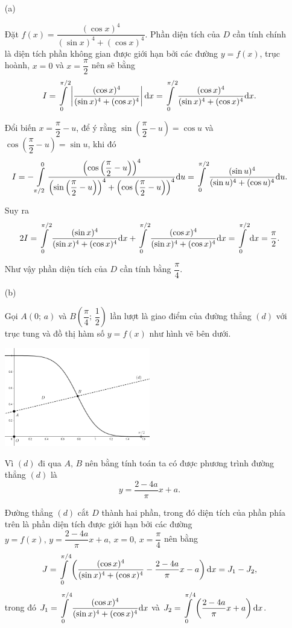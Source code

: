 \begin{enumerate}
    \item[(a)] {Đặt $f(x) = \dfrac{(\cos x)^4}{(\sin x)^4 + (\cos x)^4}$. Phần diện tích của $D$ cần tính chính là diện tích phần không gian được giới hạn bởi các đường $y = f(x)$, trục hoành, $x = 0$ và $x = \dfrac{\pi}{2}$ nên sẽ bằng 
    $$I = \int\displaylimits_{0}^{\pi/2}\left|\dfrac{(\cos x)^4}{(\sin x)^4 + (\cos x)^4}\right|\mathrm{d}x = \int\displaylimits_{0}^{\pi/2}\dfrac{(\cos x)^4}{(\sin x)^4 + (\cos x)^4}\mathrm{d}x.$$
    
    Đổi biến $x = \dfrac{\pi}{2} - u$, để ý rằng $\sin\left(\dfrac{\pi}{2}-u\right) = \cos u$ và $\cos\left(\dfrac{\pi}{2}-u\right) = \sin u$, khi đó $$I = -\int\displaylimits_{\pi/2}^{0}\dfrac{\left(\cos \left(\dfrac{\pi}{2}-u\right)\right)^4}{\left(\sin \left(\dfrac{\pi}{2}-u\right)\right)^4 + \left(\cos \left(\dfrac{\pi}{2}-u\right)\right)^4}\mathrm{d}u = \int\displaylimits_{0}^{\pi/2}\dfrac{(\sin u)^4}{(\sin u)^4 + (\cos u)^4}\mathrm{d}u.$$
    
    Suy ra $$2I = \int\displaylimits_{0}^{\pi/2}\dfrac{(\sin x)^4}{(\sin x)^4 + (\cos x)^4}\mathrm{d}x + \int\displaylimits_{0}^{\pi/2}\dfrac{(\cos x)^4}{(\sin x)^4 + (\cos x)^4}\mathrm{d}x = \int\displaylimits_{0}^{\pi/2}\mathrm{d}x = \dfrac{\pi}{2}.$$
    
    Như vậy phần diện tích của $D$ cần tính bằng $\dfrac{\pi}{4}$.}
    \item[(b)] {Gọi $A(0;\,a)$ và $B\left(\dfrac{\pi}{4};\,\dfrac{1}{2}\right)$ lần lượt là giao điểm của đường thẳng $(d)$ với trục tung và đồ thị hàm số $y = f(x)$ như hình vẽ bên dưới.
    
    \begin{center}
        \includegraphics[width=0.5\textwidth]{Figures/06.png}
    \end{center}
    
    Vì $(d)$ đi qua $A,\,B$ nên bằng tính toán ta có được phương trình đường thẳng $(d)$ là $$y = \dfrac{2-4a}{\pi}x + a.$$
    
    Đường thẳng $(d)$ cắt $D$ thành hai phần, trong đó diện tích của phần phía trên là phần diện tích được giới hạn bởi các đường $y = f(x),\,y = \dfrac{2-4a}{\pi}x + a,\,x = 0,\,x = \dfrac{\pi}{4}$ nên bằng $$J = \int\displaylimits_{0}^{\pi/4}\left(\dfrac{(\cos x)^4}{(\sin x)^4 + (\cos x)^4} - \dfrac{2-4a}{\pi}x - a\right)\mathrm{d}x = J_1 - J_2,$$ trong đó $J_1 = \displaystyle\int\displaylimits_{0}^{\pi/4}\dfrac{(\cos x)^4}{(\sin x)^4 + (\cos x)^4}\mathrm{d}x$ và $J_2 = \displaystyle\int\displaylimits_{0}^{\pi/4}\left(\dfrac{2-4a}{\pi}x + a\right)\mathrm{d}x$.
    
}
\end{enumerate}
